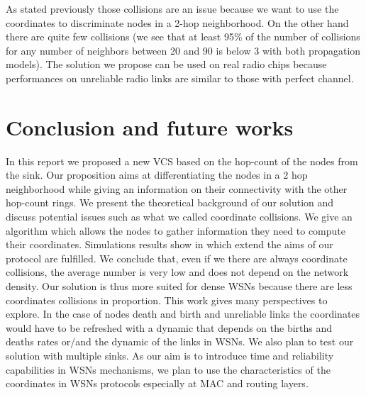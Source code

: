 \documentclass[a4paper]{article}
\begin{document}
As stated previously those collisions are an issue because we want to use the coordinates to discriminate nodes in a 2-hop neighborhood. On the other hand there are quite few collisions (we see that at least 95\% of the number of collisions for any number of neighbors between 20 and 90 is below 3 with both propagation models). The solution we propose can be used on real radio chips because performances on unreliable radio links are similar to those with perfect channel.

\section{Conclusion and future works}
In this report we proposed a new VCS based on the hop-count of the nodes from the sink. Our proposition aims at differentiating the nodes in a 2 hop neighborhood while giving an information on their connectivity with the other hop-count rings. We present the theoretical background of our solution and discuss potential issues such as what we called coordinate collisions. We give an algorithm which allows the nodes to gather information they need to compute their coordinates. Simulations results show in which extend the aims of our protocol are fulfilled. We conclude that, even if we there are always coordinate collisions, the average number is very low and does not depend on the network density. Our solution is thus more suited for dense WSNs because there are less coordinates collisions in proportion. This work gives many perspectives to explore.
In the case of nodes death and birth and unreliable links the coordinates would have to be refreshed with a dynamic that depends on the births and deaths rates or/and the dynamic of the links in WSNs. We also plan to test our solution with multiple sinks. As our aim is to introduce time and reliability capabilities in WSNs mechanisms, we plan to use the characteristics of the coordinates in WSNs protocols especially at MAC and routing layers.




\newpage
\tableofcontents
\end{document}
